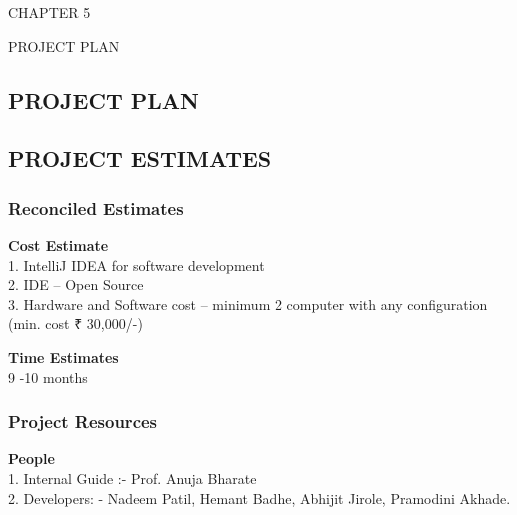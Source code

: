 \documentclass[12pt,a4paper]
{article}
\numberwithin{table}{section}
\begin{document}
{{{{\begin{minipage}{15cm}
\vspace{4 in}
 \begin{center} 
\begin{Huge}
CHAPTER 5

\vspace{0.5 in}

PROJECT PLAN
\end{Huge}

\end{center}
\end{minipage}

\newpage
\begin{center}
\section{PROJECT PLAN}
\end{center}
 {\setlength{\baselineskip}{1.0\baselineskip} 		


\subsection{PROJECT ESTIMATES}
\subsubsection{Reconciled Estimates}

\hspace{20 pt}
\textbf{{\small Cost Estimate}} \\
1. IntelliJ IDEA for software development \\
2. IDE – Open Source \\ 
3. Hardware and Software cost – minimum 2 computer with any configuration   (min. cost ₹ 30,000/-)

\vspace{0.1 in}
{\small \textbf{Time Estimates}}\\
9 -10 months
	
\vspace{0.1 in}

\subsubsection{Project Resources}

\vspace{0.1 in}
\hspace{20 pt}
\textbf{People} \\
1.	Internal Guide :- Prof. Anuja Bharate \\
2.	Developers: - Nadeem Patil, Hemant Badhe, Abhijit Jirole, Pramodini Akhade. 

}}}}}
\end{document}

